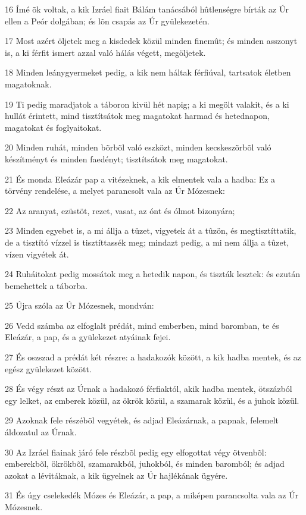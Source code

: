 \par 16 Ímé õk voltak, a kik Izráel fiait Bálám tanácsából hûtlenségre bírták az Úr ellen a Peór dolgában; és lõn csapás az Úr gyülekezetén.
\par 17 Most azért öljetek meg a kisdedek közül minden finemût; és minden asszonyt is, a ki férfit ismert azzal való hálás végett, megöljetek.
\par 18 Minden leánygyermeket pedig, a kik nem háltak férfiúval, tartsatok életben magatoknak.
\par 19 Ti pedig maradjatok a táboron kivül hét napig; a ki megölt valakit, és a ki hullát érintett, mind tisztítsátok meg magatokat harmad és hetednapon, magatokat és foglyaitokat.
\par 20 Minden ruhát, minden bõrbõl való eszközt, minden kecskeszõrbõl való készítményt és minden faedényt; tisztítsátok meg magatokat.
\par 21 És monda Eleázár pap a vitézeknek, a kik elmentek vala a hadba: Ez a törvény rendelése, a melyet parancsolt vala az Úr Mózesnek:
\par 22 Az aranyat, ezüstöt, rezet, vasat, az ónt és ólmot bizonyára;
\par 23 Minden egyebet is, a mi állja a tüzet, vigyetek át a tûzön, és megtisztíttatik, de a tisztító vízzel is tisztíttassék meg; mindazt pedig, a mi nem állja a tûzet, vízen vigyétek át.
\par 24 Ruháitokat pedig mossátok meg a hetedik napon, és tiszták lesztek: és ezután bemehettek a táborba.
\par 25 Újra szóla az Úr Mózesnek, mondván:
\par 26 Vedd számba az elfoglalt prédát, mind emberben, mind baromban, te és Eleázár, a pap, és a gyülekezet atyáinak fejei.
\par 27 És oszszad a prédát két részre: a hadakozók között, a kik hadba mentek, és az egész gyülekezet között.
\par 28 És végy részt az Úrnak a hadakozó férfiaktól, akik hadba mentek, ötszázból egy lelket, az emberek közül, az ökrök közül, a szamarak közül, és a juhok közül.
\par 29 Azoknak fele részébõl vegyétek, és adjad Eleázárnak, a papnak, felemelt áldozatul az Úrnak.
\par 30 Az Izráel fiainak járó fele részbõl pedig egy elfogottat végy ötvenbõl: emberekbõl, ökrökbõl, szamarakból, juhokból, és minden baromból; és adjad azokat a lévitáknak, a kik ügyelnek az Úr hajlékának ügyére.
\par 31 És úgy cselekedék Mózes és Eleázár, a pap, a miképen parancsolta vala az Úr Mózesnek.
